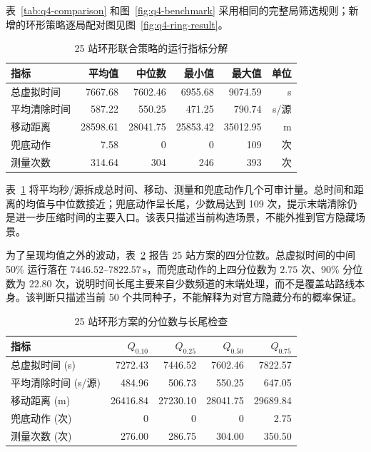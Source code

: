 表~\ref{tab:q4-comparison} 和图~\ref{fig:q4-benchmark} 采用相同的完整局筛选规则；新增的环形策略逐局配对图见图~\ref{fig:q4-ring-result}。

\begin{table}[H]\centering\small
\caption{25 站环形联合策略的运行指标分解}\label{tab:q4-diagnostics}
\begin{tabular}{lrrrrr}
\toprule
指标 & 平均值 & 中位数 & 最小值 & 最大值 & 单位 \\
\midrule
总虚拟时间 & 7667.68 & 7602.46 & 6955.68 & 9074.59 & s \\
平均清除时间 & 587.22 & 550.25 & 471.25 & 790.74 & s/源 \\
移动距离 & 28598.61 & 28041.75 & 25853.42 & 35012.95 & m \\
兜底动作 & 7.58 & 0 & 0 & 109 & 次 \\
测量次数 & 314.64 & 304 & 246 & 393 & 次 \\
\bottomrule
\end{tabular}
\end{table}

表~\ref{tab:q4-diagnostics} 将平均秒/源拆成总时间、移动、测量和兜底动作几个可审计量。总时间和距离的均值与中位数接近；兜底动作呈长尾，少数局达到 109 次，提示末端清除仍是进一步压缩时间的主要入口。该表只描述当前构造场景，不能外推到官方隐藏场景。

为了呈现均值之外的波动，表~\ref{tab:q4-quartiles} 报告 25 站方案的四分位数。总虚拟时间的中间 50\% 运行落在 $7446.52$--$7822.57\,\mathrm s$，而兜底动作的上四分位数为 $2.75$ 次、90\% 分位数为 $22.80$ 次，说明时间长尾主要来自少数频道的末端处理，而不是覆盖站路线本身。该判断只描述当前 50 个共同种子，不能解释为对官方隐藏分布的概率保证。

\begin{table}[H]\centering\small
\caption{25 站环形方案的分位数与长尾检查}\label{tab:q4-quartiles}
\begin{tabular}{lrrrr}
\toprule
指标 & $Q_{0.10}$ & $Q_{0.25}$ & $Q_{0.50}$ & $Q_{0.75}$ \\
\midrule
总虚拟时间 (s) & 7272.43 & 7446.52 & 7602.46 & 7822.57 \\
平均清除时间 (s/源) & 484.96 & 506.73 & 550.25 & 647.05 \\
移动距离 (m) & 26416.84 & 27230.10 & 28041.75 & 29689.84 \\
兜底动作 (次) & 0 & 0 & 0 & 2.75 \\
测量次数 (次) & 276.00 & 286.75 & 304.00 & 350.50 \\
\bottomrule
\end{tabular}
\end{table}

